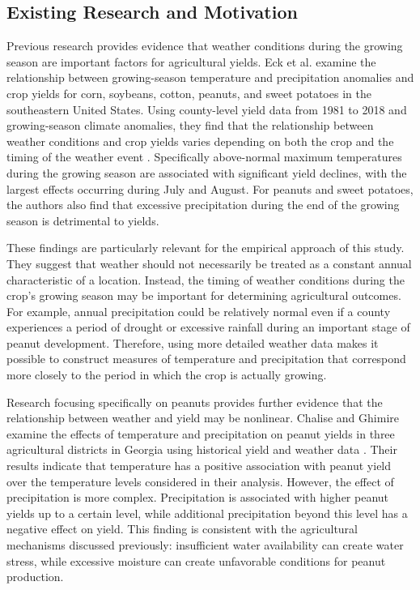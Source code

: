 \documentclass{article}
\begin{document}
\subsection{Existing Research and Motivation}
\label{subsec:existing-research}

Previous research provides evidence that weather conditions during the growing season are important factors for agricultural yields. Eck et al. examine the relationship between growing-season temperature and precipitation anomalies and crop yields for corn, soybeans, cotton, peanuts, and sweet potatoes in the southeastern United States. Using county-level yield data from 1981 to 2018 and growing-season climate anomalies, they find that the relationship between weather conditions and crop yields varies depending on both the crop and the timing of the weather event \cite{InfluceceOfGrowingSeasonTempAnomalies}. Specifically above-normal maximum temperatures during the growing season are associated with significant yield declines, with the largest effects occurring during July and August. For peanuts and sweet potatoes, the authors also find that excessive precipitation during the end of the growing season is detrimental to yields.

These findings are particularly relevant for the empirical approach of this study. They suggest that weather should not necessarily be treated as a constant annual characteristic of a location. Instead, the timing of weather conditions during the crop's growing season may be important for determining agricultural outcomes. For example, annual precipitation could be relatively normal even if a county experiences a period of drought or excessive rainfall during an important stage of peanut development. Therefore, using more detailed weather data makes it possible to construct measures of temperature and precipitation that correspond more closely to the period in which the crop is actually growing.

Research focusing specifically on peanuts provides further evidence that the relationship between weather and yield may be nonlinear. Chalise and Ghimire examine the effects of temperature and precipitation on peanut yields in three agricultural districts in Georgia using historical yield and weather data \cite{PrecipitationOnPeanuts}. Their results indicate that temperature has a positive association with peanut yield over the temperature levels considered in their analysis. However, the effect of precipitation is more complex. Precipitation is associated with higher peanut yields up to a certain level, while additional precipitation beyond this level has a negative effect on yield. This finding is consistent with the agricultural mechanisms discussed previously: insufficient water availability can create water stress, while excessive moisture can create unfavorable conditions for peanut production.
\end{document}
